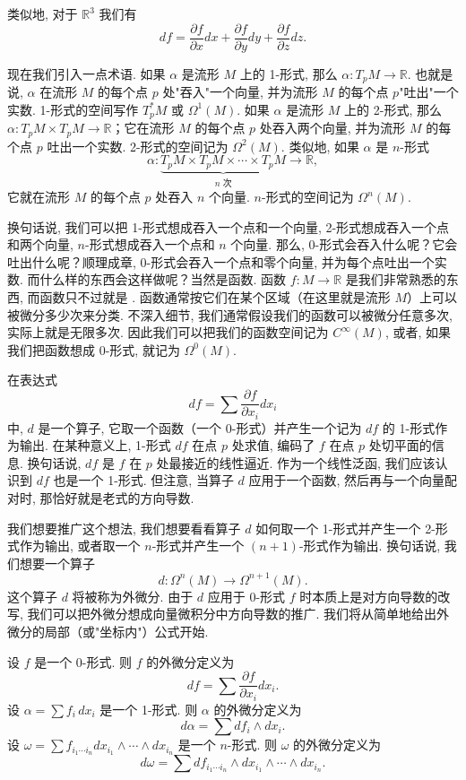 类似地, 对于 $\mathbb{R}^3$ 我们有
\[
df=\frac{\partial f}{\partial x}dx+\frac{\partial f}{\partial y}dy+\frac{\partial f}{\partial z}dz.
\]

现在我们引入一点术语. 如果 $\alpha$ 是流形 $M$ 上的 1-形式, 那么 $\alpha:T_pM\to\mathbb{R}$. 也就是说, $\alpha$ 在流形 $M$ 的每个点 $p$ 处"吞入"一个向量, 并为流形 $M$ 的每个点 $p$"吐出"一个实数. 1-形式的空间写作 $T_p^*M$ 或 $\Omega^1(M)$. 如果 $\alpha$ 是流形 $M$ 上的 2-形式, 那么 $\alpha:T_pM\times T_pM\to\mathbb{R}$；它在流形 $M$ 的每个点 $p$ 处吞入两个向量, 并为流形 $M$ 的每个点 $p$ 吐出一个实数. 2-形式的空间记为 $\Omega^2(M)$. 类似地, 如果 $\alpha$ 是 $n$-形式
\[
\alpha:\underbrace{T_pM\times T_pM\times\cdots\times T_pM}_{n\text{ 次}}\to\mathbb{R},
\]
它就在流形 $M$ 的每个点 $p$ 处吞入 $n$ 个向量. $n$-形式的空间记为 $\Omega^n(M)$.

换句话说, 我们可以把 1-形式想成吞入一个点和一个向量, 2-形式想成吞入一个点和两个向量, $n$-形式想成吞入一个点和 $n$ 个向量. 那么, 0-形式会吞入什么呢？它会吐出什么呢？顺理成章, 0-形式会吞入一个点和零个向量, 并为每个点吐出一个实数. 而什么样的东西会这样做呢？当然是函数. 函数 $f:M\to\mathbb{R}$ 是我们非常熟悉的东西, 而函数只不过就是 . 函数通常按它们在某个区域（在这里就是流形 $M$）上可以被微分多少次来分类. 不深入细节, 我们通常假设我们的函数可以被微分任意多次, 实际上就是无限多次. 因此我们可以把我们的函数空间记为 $C^\infty(M)$, 或者, 如果我们把函数想成 0-形式, 就记为 $\Omega^0(M)$.

在表达式
\[
df=\sum\frac{\partial f}{\partial x_i}dx_i
\]
中, $d$ 是一个算子, 它取一个函数（一个 0-形式）并产生一个记为 $df$ 的 1-形式作为输出. 在某种意义上, 1-形式 $df$ 在点 $p$ 处求值, 编码了 $f$ 在点 $p$ 处切平面的信息. 换句话说, $df$ 是 $f$ 在 $p$ 处最接近的线性逼近. 作为一个线性泛函, 我们应该认识到 $df$ 也是一个 1-形式. 但注意, 当算子 $d$ 应用于一个函数, 然后再与一个向量配对时, 那恰好就是老式的方向导数.

我们想要推广这个想法, 我们想要看看算子 $d$ 如何取一个 1-形式并产生一个 2-形式作为输出, 或者取一个 $n$-形式并产生一个 $(n+1)$-形式作为输出. 换句话说, 我们想要一个算子
\[
d:\Omega^n(M)\to\Omega^{n+1}(M).
\]
这个算子 $d$ 将被称为外微分. 由于 $d$ 应用于 0-形式 $f$ 时本质上是对方向导数的改写, 我们可以把外微分想成向量微积分中方向导数的推广. 我们将从简单地给出外微分的局部（或"坐标内"）公式开始.

\begin{definition}[外微分的局部公式]\label{def:4-2-1}
设 $f$ 是一个 0-形式. 则 $f$ 的外微分定义为
\[
df=\sum\frac{\partial f}{\partial x_i}dx_i.
\]
设 $\alpha=\sum f_i\,dx_i$ 是一个 1-形式. 则 $\alpha$ 的外微分定义为
\[
d\alpha=\sum df_i\wedge dx_i.
\]
设 $\omega=\sum f_{i_1\cdots i_n}dx_{i_1}\wedge\cdots\wedge dx_{i_n}$ 是一个 $n$-形式. 则 $\omega$ 的外微分定义为
\[
d\omega=\sum df_{i_1\cdots i_n}\wedge dx_{i_1}\wedge\cdots\wedge dx_{i_n}.
\]
\end{definition}

